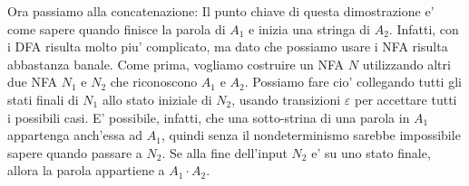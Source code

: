 Ora passiamo alla concatenazione:
Il punto chiave di questa dimostrazione e' come sapere quando finisce la parola di $ A_1 $ e inizia una stringa di $ A_2 $. Infatti, con i DFA risulta molto piu' complicato, ma dato che possiamo usare i NFA risulta abbastanza banale. Come prima, vogliamo costruire un NFA $ N $ utilizzando altri due NFA $ N_1 $ e $ N_2 $ che riconoscono $ A_1 $ e $ A_2 $. Possiamo fare cio' collegando tutti gli stati finali di $ N_1 $ allo stato iniziale di $ N_2 $, usando transizioni $ \varepsilon $ per accettare tutti i possibili casi. E' possibile, infatti, che una sotto-strina di una parola in $ A_1 $ appartenga anch'essa ad $ A_1 $, quindi senza il nondeterminismo sarebbe impossibile sapere quando passare a $ N_2 $. Se alla fine dell'input $ N_2 $ e' su uno stato finale, allora la parola appartiene a $ A_1 \cdot A_2 $.

